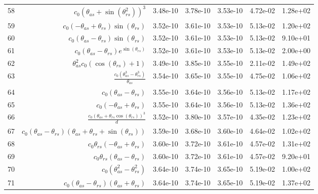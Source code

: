 \begin{tabularx}{\textwidth}{lRRRRRl}
58  &  $ c_{0} \left(\theta_{as} + \sin{\left(\theta_{rs}^{2} \right)}\right)^{3} $  &  3.48e-10  &  3.78e-10  &  3.53e-10  &  4.72e-02  &  1.28e+02  \\ 
59  &  $ c_{0} \left(- \theta_{as} + \theta_{rs}\right) \sin{\left(\theta_{rs} \right)} $  &  3.52e-10  &  3.61e-10  &  3.53e-10  &  5.13e-02  &  1.20e+02  \\ 
60  &  $ c_{0} \left(\theta_{as} - \theta_{rs}\right) \sin{\left(\theta_{rs} \right)} $  &  3.52e-10  &  3.61e-10  &  3.53e-10  &  5.13e-02  &  9.10e+01  \\ 
61  &  $ c_{0} \left(\theta_{as} - \theta_{rs}\right) e^{\sin{\left(\theta_{rs} \right)}} $  &  3.52e-10  &  3.61e-10  &  3.53e-10  &  5.13e-02  &  2.00e+00  \\ 
62  &  $ \theta_{as}^{2} c_{0} \left(\cos{\left(\theta_{rs} \right)} + 1\right) $  &  3.49e-10  &  3.85e-10  &  3.55e-10  &  2.11e-02  &  1.49e+02  \\ 
63  &  $ \displaystyle\frac{c_{0} \left(\theta_{as}^{3} - \theta_{rs}^{3}\right)}{\theta_{as}} $  &  3.54e-10  &  3.65e-10  &  3.55e-10  &  4.75e-02  &  1.06e+02  \\ 
64  &  $ c_{0} \left(\theta_{as} - \theta_{rs}\right) $  &  3.55e-10  &  3.64e-10  &  3.56e-10  &  5.13e-02  &  1.17e+02  \\ 
65  &  $ c_{0} \left(- \theta_{as} + \theta_{rs}\right) $  &  3.55e-10  &  3.64e-10  &  3.56e-10  &  5.13e-02  &  1.36e+02  \\ 
66  &  $ \displaystyle\frac{c_{0} \left(\theta_{as} + \theta_{rs} \cos{\left(\theta_{rs} \right)}\right)^{3}}{d} $  &  3.52e-10  &  3.80e-10  &  3.57e-10  &  4.35e-02  &  1.23e+02  \\ 
67  &  $ c_{0} \left(\theta_{as} - \theta_{rs}\right) \left(\theta_{as} + \theta_{rs} + \sin{\left(\theta_{rs} \right)}\right) $  &  3.59e-10  &  3.68e-10  &  3.60e-10  &  4.64e-02  &  1.02e+02  \\ 
68  &  $ c_{0} \theta_{rs} \left(- \theta_{as} + \theta_{rs}\right) $  &  3.60e-10  &  3.72e-10  &  3.61e-10  &  4.57e-02  &  1.31e+02  \\ 
69  &  $ c_{0} \theta_{rs} \left(\theta_{as} - \theta_{rs}\right) $  &  3.60e-10  &  3.72e-10  &  3.61e-10  &  4.57e-02  &  9.20e+01  \\ 
70  &  $ c_{0} \left(\theta_{as}^{2} - \theta_{rs}^{2}\right) $  &  3.64e-10  &  3.74e-10  &  3.65e-10  &  5.19e-02  &  1.00e+02  \\ 
71  &  $ c_{0} \left(\theta_{as} - \theta_{rs}\right) \left(\theta_{as} + \theta_{rs}\right) $  &  3.64e-10  &  3.74e-10  &  3.65e-10  &  5.19e-02  &  1.37e+02  \\ 

\end{tabularx}
